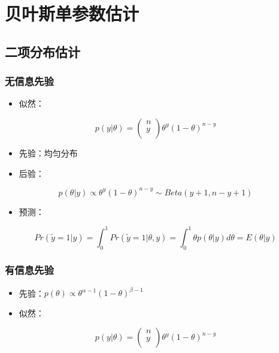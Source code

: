 \section{贝叶斯单参数估计}
\subsection{二项分布估计}

\subsubsection{\textbf{无信息先验}}

\begin{itemize}
\item
  似然：
\end{itemize}

\begin{equation} 
p(y|\theta)=
\left(                 
  \begin{array}{ccc}   
    n\\ 
    y\\  
  \end{array}
\right)                 
\theta^y(1-\theta)^{n-y}
\end{equation}

\begin{itemize}
\item
  先验：均匀分布
\item
  后验：
\end{itemize}

\begin{equation}
  p(\theta|y)\propto\theta^y(1-\theta)^{n-y}\sim Beta(y+1,n-y+1)
\end{equation}

\begin{itemize}
\item
  预测：
\end{itemize}

\begin{equation}
  Pr(\widetilde y=1|y)=\int_0^1Pr(\widetilde y=1|\theta,y)
  =\int_0^1\theta p(\theta|y)d\theta=E(\theta|y)
\end{equation}

\subsubsection{\textbf{有信息先验}}

\begin{itemize}
\item
  先验：\(p(\theta)\propto \theta^{\alpha-1}(1-\theta)^{\beta-1}\)
\item
  似然：
\end{itemize}
\begin{equation}      
p(y|\theta)=
\left(                 
  \begin{array}{ccc}   
    n\\ 
    y\\  
  \end{array}
\right)                 
\theta^y(1-\theta)^{n-y}
\end{equation}

